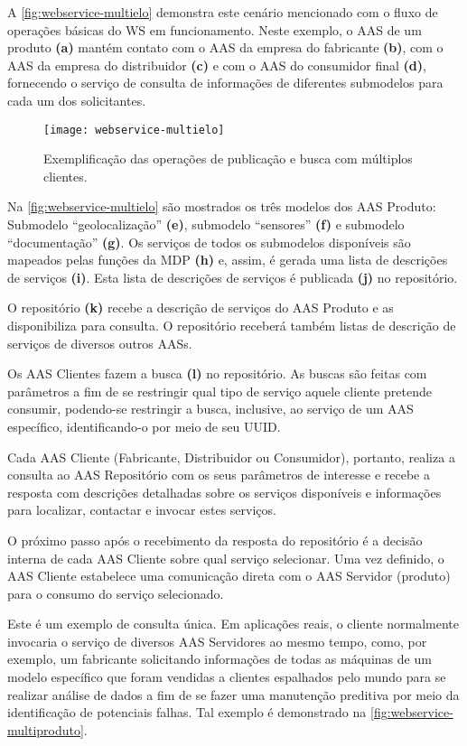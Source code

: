 	A \autoref{fig:webservice-multielo} demonstra este cenário mencionado com o fluxo de operações básicas do WS em funcionamento. Neste exemplo, o AAS de um produto \textbf{(a)} mantém contato com o AAS da empresa do fabricante \textbf{(b)}, com o AAS da empresa do distribuidor \textbf{(c)} e com o AAS do consumidor final \textbf{(d)}, fornecendo o serviço de consulta de informações de diferentes submodelos para cada um dos solicitantes. 	
	
	\begin{figure}[htb]
		\centering
		\caption{Exemplificação das operações de publicação e busca com múltiplos clientes.}
		\label{fig:webservice-multielo}
		\texttt{[image: webservice-multielo]}
	\end{figure}

	Na \autoref{fig:webservice-multielo} são mostrados os três modelos dos AAS Produto: Submodelo ``geolocalização'' \textbf{(e)}, submodelo ``sensores'' \textbf{(f)} e submodelo ``documentação'' \textbf{(g)}. Os serviços de todos os submodelos disponíveis são mapeados pelas funções da MDP \textbf{(h)} e, assim, é gerada uma lista de descrições de serviços \textbf{(i)}. Esta lista de descrições de serviços é publicada \textbf{(j)} no repositório.
	
	O repositório \textbf{(k)} recebe a descrição de serviços do AAS Produto e as disponibiliza para consulta. O repositório receberá também listas de descrição de serviços de diversos outros AASs.
	
	Os AAS Clientes fazem a busca \textbf{(l)} no repositório. As buscas são feitas com parâmetros a fim de se restringir qual tipo de serviço aquele cliente pretende consumir, podendo-se restringir a busca, inclusive, ao serviço de um AAS específico, identificando-o por meio de seu UUID.
	
	Cada AAS Cliente (Fabricante, Distribuidor ou Consumidor), portanto, realiza a consulta ao AAS Repositório com os seus parâmetros de interesse e recebe a resposta com descrições detalhadas sobre os serviços disponíveis e informações para localizar, contactar e invocar estes serviços.
	
	O próximo passo após o recebimento da resposta do repositório é a decisão interna de cada AAS Cliente sobre qual serviço selecionar. Uma vez definido, o AAS Cliente estabelece uma comunicação direta com o AAS Servidor (produto) para o consumo do serviço selecionado.
	
	Este é um exemplo de consulta única. Em aplicações reais, o cliente normalmente invocaria o serviço de diversos AAS Servidores ao mesmo tempo, como, por exemplo, um fabricante solicitando informações de todas as máquinas de um modelo específico que foram vendidas a clientes espalhados pelo mundo para se realizar análise de dados a fim de se fazer uma manutenção preditiva por meio da identificação de potenciais falhas. Tal exemplo é demonstrado na \autoref{fig:webservice-multiproduto}.
	
